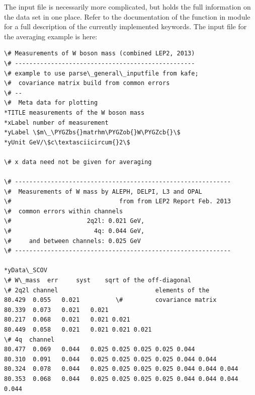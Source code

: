 \documentclass[a4paper,10pt,english]{sphinxmanual}
\def\PYGZbs{\char`\\}
\def\PYGZob{\char`\{}
\def\PYGZcb{\char`\}}
\begin{document}
The input file is necessarily more complicated, but holds
the full information on the data set in one place. Refer to
the documentation of the function {\hyperref[index:kafe.file_tools.parse_general_inputfile]{}}
in module {\hyperref[index:module-file_tools]{}} for a full description of the
currently implemented keywords. The input file for the
averaging example is here:

\begin{Verbatim}[commandchars=\\\{\}]
\# Measurements of W boson mass (combined LEP2, 2013)
\# --------------------------------------------------
\# example to use parse\_general\_inputfile from kafe;
\#  covariance matrix build from common errors
\# --
\#  Meta data for plotting
*TITLE measurements of the W boson mass
*xLabel number of measurement
*yLabel \$m\_\PYGZbs{}matrhm\PYGZob{}W\PYGZcb{}\$
*yUnit GeV/\$c\textasciicircum{}2\$

\# x data need not be given for averaging

\# ------------------------------------------------------------
\#  Measurements of W mass by ALEPH, DELPI, L3 and OPAL
\#                              from from LEP2 Report Feb. 2013
\#  common errors within channels
\#                     2q2l: 0.021 GeV,
\#                       4q: 0.044 GeV,
\#     and between channels: 0.025 GeV
\# ------------------------------------------------------------

*yData\_SCOV
\# W\_mass  err     syst    sqrt of the off-diagonal
\# 2q2l channel                           elements of the
80.429  0.055   0.021          \#         covariance matrix
80.339  0.073   0.021   0.021
80.217  0.068   0.021   0.021 0.021
80.449  0.058   0.021   0.021 0.021 0.021
\# 4q  channel
80.477  0.069   0.044   0.025 0.025 0.025 0.025 0.044
80.310  0.091   0.044   0.025 0.025 0.025 0.025 0.044 0.044
80.324  0.078   0.044   0.025 0.025 0.025 0.025 0.044 0.044 0.044
80.353  0.068   0.044   0.025 0.025 0.025 0.025 0.044 0.044 0.044 0.044
\end{Verbatim}
\end{document}
